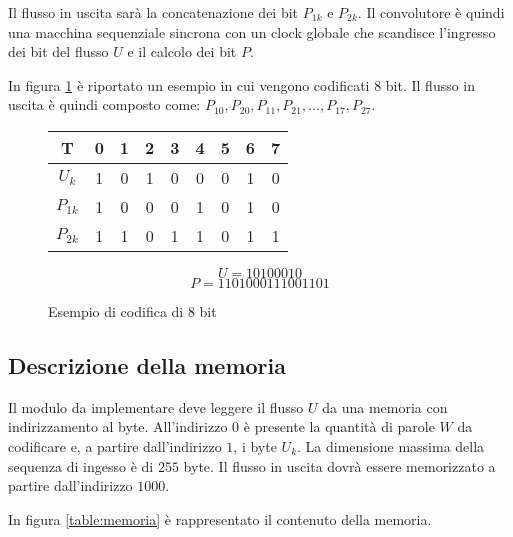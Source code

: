 Il flusso in uscita sarà la concatenazione dei bit $P_{1k}$ e $P_{2k}$. Il convolutore è quindi una macchina sequenziale sincrona con un clock globale che scandisce l'ingresso dei bit del flusso $U$ e il calcolo dei bit $P$.

\newpage

In figura \ref{table:esempio8bit} è riportato un esempio in cui vengono codificati 8 bit. Il flusso in uscita è quindi composto come: $P_{10},P_{20},P_{11},P_{21},...,P_{17},P_{27}$.

\begin{figure}[!ht]
    \centering
    \begin{minipage}{0.4\linewidth}
        \begin{tabular}{c | c | c | c | c | c | c | c | c}
            T        & 0 & 1 & 2 & 3 & 4 & 5 & 6 & 7 \\
            \hline
            $U_k$    & 1 & 0 & 1 & 0 & 0 & 0 & 1 & 0 \\
            $P_{1k}$ & 1 & 0 & 0 & 0 & 1 & 0 & 1 & 0 \\
            $P_{2k}$ & 1 & 1 & 0 & 1 & 1 & 0 & 1 & 1 \\
        \end{tabular}
    \end{minipage}
    \begin{minipage}{0.4\linewidth}
        \begin{equation*}
            U = 10100010
        \end{equation*}
        \begin{equation*}
            P = 1101000111001101
        \end{equation*}
    \end{minipage}
    \caption{Esempio di codifica di 8 bit}
    \label{table:esempio8bit}
\end{figure}

\subsection{Descrizione della memoria}

Il modulo da implementare deve leggere il flusso $U$ da una memoria con indirizzamento al byte. All'indirizzo $0$ è presente la quantità di parole $W$ da codificare e, a partire dall'indirizzo $1$, i byte $U_k$. La dimensione massima della sequenza di ingesso è di $255$ byte. Il flusso in uscita dovrà essere memorizzato a partire dall'indirizzo $1000$.

In figura \ref{table:memoria} è rappresentato il contenuto della memoria.

